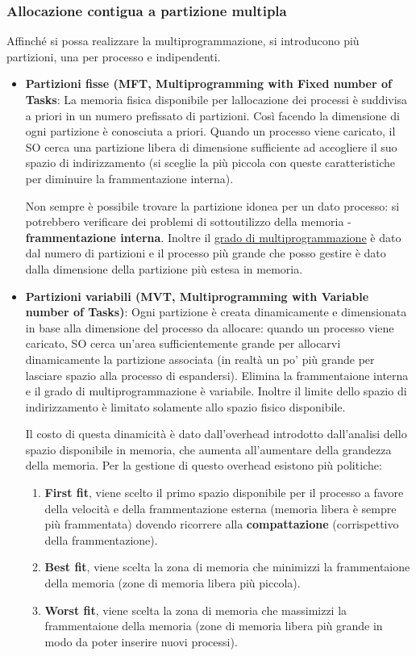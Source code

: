 \documentclass{article}
\begin{document}
\subsubsection{Allocazione contigua a partizione multipla}
\noindent Affinché si possa realizzare la multiprogrammazione, si introducono più partizioni, una per processo e indipendenti. 
\begin{itemize}
    \item \textbf{Partizioni fisse (MFT, Multiprogramming with Fixed number of Tasks}: La memoria fisica disponibile per lallocazione dei processi è suddivisa a priori
     in un numero prefissato di partizioni. Così facendo la dimensione di ogni partizione è conosciuta a priori. Quando un processo viene caricato, il SO cerca
     una partizione libera di dimensione sufficiente ad accogliere il suo spazio di indirizzamento (si sceglie la più piccola con queste caratteristiche per diminuire la 
     frammentazione interna).
     
     \noindent Non sempre è possibile trovare la partizione idonea per un dato processo: si potrebbero verificare dei problemi di sottoutilizzo della memoria - \textbf{frammentazione
     interna}. Inoltre il \underline{grado di multiprogrammazione} è dato dal numero di partizioni e il processo più grande che posso gestire è dato dalla dimensione della partizione
     più estesa in memoria.

     \item \textbf{Partizioni variabili (MVT, Multiprogramming with Variable number of Tasks)}: Ogni partizione è creata dinamicamente e dimensionata in base alla dimensione
     del processo da allocare: quando un processo viene caricato, SO cerca un'area sufficientemente grande per allocarvi dinamicamente la partizione associata (in realtà un po'
     più grande per lasciare spazio alla processo di espandersi).
     Elimina la frammentaione interna e il grado di multiprogrammazione è variabile. Inoltre il limite dello spazio di indirizzamento è limitato solamente allo spazio fisico disponibile.

     \noindent Il costo di questa dinamicità è dato dall'overhead introdotto dall'analisi dello spazio disponibile in memoria, che aumenta all'aumentare della grandezza della memoria.
     Per la gestione di questo overhead esistono più politiche: 
     \begin{enumerate}
         \item \textbf{First fit}, viene scelto il primo spazio disponibile per il processo a favore della velocità e della 
         frammentazione esterna (memoria libera è sempre più frammentata) dovendo ricorrere alla \textbf{compattazione} (corrispettivo della frammentazione).
        \item \textbf{Best fit}, viene scelta la zona di memoria che minimizzi la frammentaione della memoria (zone di memoria libera più
        piccola).
        \item \textbf{Worst fit}, viene scelta la zona di memoria che massimizzi la frammentaione della memoria (zone di memoria libera più
        grande in modo da poter inserire nuovi processi).
     \end{enumerate}
     \end{itemize}
\end{document}
